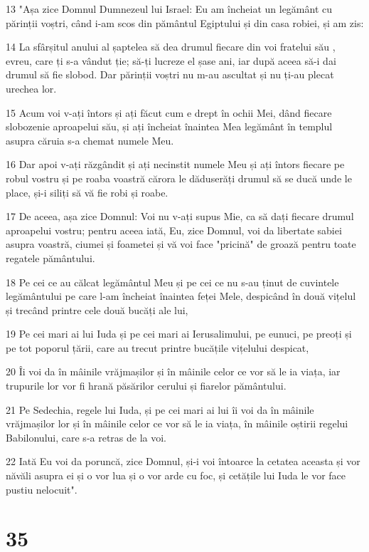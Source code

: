\par 13 "Așa zice Domnul Dumnezeul lui Israel: Eu am încheiat un legământ cu părinții voștri, când i-am scos din pământul Egiptului și din casa robiei, și am zis:
\par 14 La sfârșitul anului al șaptelea să dea drumul fiecare din voi fratelui său , evreu, care ți s-a vândut ție; să-ți lucreze el șase ani, iar după aceea să-i dai drumul să fie slobod. Dar părinții voștri nu m-au ascultat și nu ți-au plecat urechea lor.
\par 15 Acum voi v-ați întors și ați făcut cum e drept în ochii Mei, dând fiecare slobozenie aproapelui său, și ați încheiat înaintea Mea legământ în templul asupra căruia s-a chemat numele Meu.
\par 16 Dar apoi v-ați răzgândit și ați necinstit numele Meu și ați întors fiecare pe robul vostru și pe roaba voastră cărora le dăduserăți drumul să se ducă unde le place, și-i siliți să vă fie robi și roabe.
\par 17 De aceea, așa zice Domnul: Voi nu v-ați supus Mie, ca să dați fiecare drumul aproapelui vostru; pentru aceea iată, Eu, zice Domnul, voi da libertate sabiei asupra voastră, ciumei și foametei și vă voi face "pricină" de groază pentru toate regatele pământului.
\par 18 Pe cei ce au călcat legământul Meu și pe cei ce nu s-au ținut de cuvintele legământului pe care l-am încheiat înaintea feței Mele, despicând în două vițelul și trecând printre cele două bucăți ale lui,
\par 19 Pe cei mari ai lui Iuda și pe cei mari ai Ierusalimului, pe eunuci, pe preoți și pe tot poporul țării, care au trecut printre bucățile vițelului despicat,
\par 20 Îi voi da în mâinile vrăjmașilor și în mâinile celor ce vor să le ia viața, iar trupurile lor vor fi hrană păsărilor cerului și fiarelor pământului.
\par 21 Pe Sedechia, regele lui Iuda, și pe cei mari ai lui îi voi da în mâinile vrăjmașilor lor și în mâinile celor ce vor să le ia viața, în mâinile oștirii regelui Babilonului, care s-a retras de la voi.
\par 22 Iată Eu voi da poruncă, zice Domnul, și-i voi întoarce la cetatea aceasta și vor năvăli asupra ei și o vor lua și o vor arde cu foc, și cetățile lui Iuda le vor face pustiu nelocuit".

\chapter{35}

